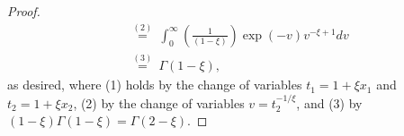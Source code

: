 \begin{proof}
\begin{align*}
&\overset{(2)}{=}~\int_{0}^{\infty }( \frac{1}{( 1-\xi ) }) \exp ( -v) v^{-\xi +1}dv \\
&\overset{(3)}{=}~\Gamma ( 1-\xi ) ,
\end{align*}%
as desired, where (1) holds by the change of variables $t_{1}=1+\xi x_{1}$ and $t_{2}=1+\xi x_{2}$, (2) by the change of variables $v=t_{2}^{-1/\xi }$, and (3) by $( 1-\xi ) \Gamma ( 1-\xi ) =\Gamma ( 2-\xi ) $.
\end{proof}

